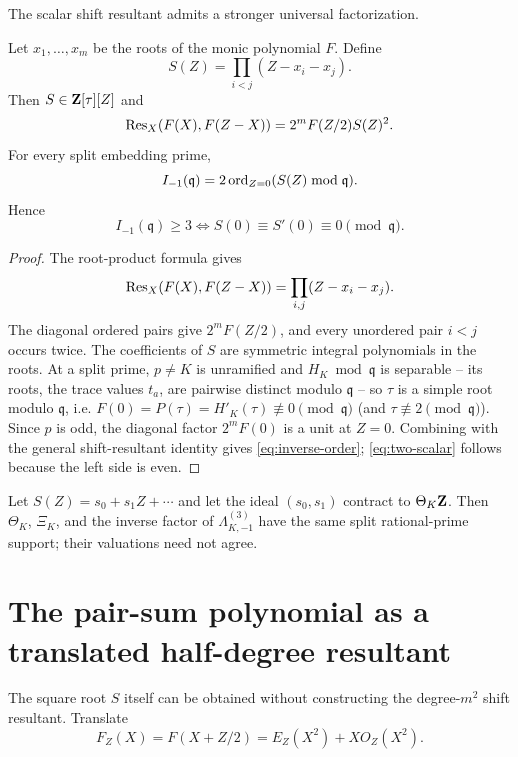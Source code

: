 The scalar shift resultant admits a stronger universal factorization.

\begin{theorem}\label{thm:pairsum}
Let $x_1,\ldots,x_m$ be the roots of the monic polynomial $F$.  Define
\[
S(Z)=\prod_{i<j}(Z-x_i-x_j).
\]
Then $S\in\mathbf Z[\tau][Z]$ and
\begin{equation}\label{eq:pairsquare}
\operatorname{Res}_X(F(X),F(Z-X))=2^mF(Z/2)S(Z)^2.
\end{equation}
For every split embedding prime,
\begin{equation}\label{eq:inverse-order}
I_{-1}(\mathfrak q)=2\operatorname{ord}_{Z=0}(S(Z)\bmod\mathfrak q).
\end{equation}
Hence
\begin{equation}\label{eq:two-scalar}
I_{-1}(\mathfrak q)\ge3
\iff
S(0)\equiv S'(0)\equiv0\pmod{\mathfrak q}.
\end{equation}
\end{theorem}

\begin{proof}
The root-product formula gives
\[
\operatorname{Res}_X(F(X),F(Z-X))=\prod_{i,j}(Z-x_i-x_j).
\]
The diagonal ordered pairs give $2^mF(Z/2)$, and every unordered pair $i<j$
occurs twice.  The coefficients of $S$ are symmetric integral polynomials in
the roots.  At a split prime, $p\ne K$ is unramified and
$H_K\bmod\mathfrak q$ is separable -- its roots, the trace values $t_a$,
are pairwise distinct modulo $\mathfrak q$ -- so $\tau$ is a simple root
modulo $\mathfrak q$, i.e. $F(0)=P(\tau)=H'_K(\tau)\not\equiv0
\pmod{\mathfrak q}$ (and $\tau\not\equiv2\pmod{\mathfrak q}$).  Since $p$
is odd, the diagonal factor $2^mF(0)$ is a unit at $Z=0$.  Combining with the
general shift-resultant identity gives \eqref{eq:inverse-order};
\eqref{eq:two-scalar} follows because the left side is even.
\end{proof}

Let $S(Z)=s_0+s_1Z+\cdots$ and let the ideal $(s_0,s_1)$ contract to
$\Theta_K\mathbf Z$.  Then $\Theta_K$, $\Xi_K$, and the inverse factor of
$\Lambda_{K,-1}^{(3)}$ have the same split rational-prime support; their
valuations need not agree.

\section{The pair-sum polynomial as a translated half-degree resultant}

The square root $S$ itself can be obtained without constructing the
degree-$m^2$ shift resultant.  Translate
\begin{equation}\label{eq:translatedF}
F_Z(X)=F(X+Z/2)=E_Z(X^2)+XO_Z(X^2).
\end{equation}

